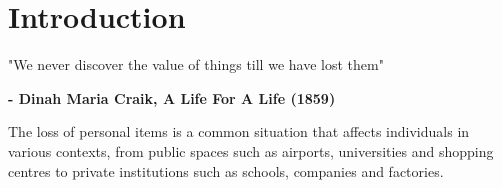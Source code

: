 \chapter{Introduction}
\label{chapter:introduction}

\begin{introduction}
"We never discover the value of things till we have lost them"

\textbf{- Dinah Maria Craik, A Life For A Life (1859)}
\end{introduction}


The loss of personal items is a common situation that affects individuals in various contexts, from public spaces such as airports, universities and shopping centres \cites{Oke2017, Yao2019} to private institutions such as schools, companies and factories.


